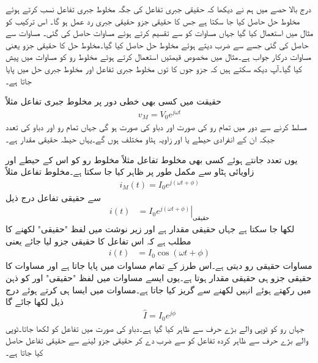 درج بالا حصے میں ہم نے دیکھا کہ حقیقی جبری تفاعل کی جگہ مخلوط جبری تفاعل نسب کرتے ہوئے مخلوط حل حاصل کیا جا سکتا ہے جس کا حقیقی جزو حقیقی جبری رد عمل ہو گا۔ اس ترکیب کو مثال  میں استعمال کیا گیا جہاں مساوات  کو  سے تقسیم کرتے ہوئے مساوات  حاصل کی گئی۔ مساوات  سے  حاصل کی گئی جسے   سے ضرب دیتے ہوئے مخلوط حل حاصل کیا گیا۔مخلوط حل کا حقیقی جزو یعنی مساوات  درکار جواب ہے۔مثال  میں  مخصوص قیمتیں استعمال کرتے  ہوئے مخلوط رو کو مساوات   میں پیش کیا گیا۔آپ دیکھ سکتے ہیں کہ جزو   جوں کا توں مخلوط جبری تفاعل اور مخلوط جبری حل میں پایا جاتا ہے۔

حقیقت میں کسی بھی خطی دور پر مخلوط جبری تفاعل مثلاً
\begin{align}
v_M=V_0 e^{j \omega t}
\end{align}
مسلط کرنے سے دور میں تمام رو کی صورت  اور دباو کی صورت  ہو گی جہاں تمام رو اور دباو  کی تعدد  جبکہ ان کے انفرادی  حیطے  یا  اور زاویہ ہٹاو  مختلف ہوں گے۔یہاں حیطہ حقیقی مقدار ہے۔

یوں تعدد جانتے ہوئے کسی بھی مخلوط تفاعل مثلاً مخلوط رو کو اس کے حیطے  اور زاویائی ہٹاو  سے مکمل طور پر ظاہر کیا جا سکتا ہے۔مخلوط تفاعل مثلاً 
\begin{align}
i_M(t)=I_0 e^{j(\omega t+\phi)}
\end{align}
سے حقیقی تفاعل درج ذیل
\begin{align}\label{مساوات_بدلتا_حقیقی_رو_الف}
i(t)&=\left. I_0 e^{j(\omega t+\phi)} \right|_{\text{حقیقی}}
\end{align}
لکھا جا سکتا ہے جہاں  حقیقی مقدار ہے اور زیر نوشت میں لفظ "حقیقی" لکھنے کا مطلب ہے کہ اس تفاعل کا حقیقی جزو لیا جائے یعنی
\begin{align}\label{مساوات_بدلتا_حقیقی_رو_ب}
i(t)&=I_0 \cos (\omega t+\phi)
\end{align}
مساوات  حقیقی رو دیتی ہے۔اس طرز کے تمام مساوات میں  پایا جاتا ہے اور مساوات کا حقیقی جزو ہی حقیقی مقدار ہوتا ہے۔یوں ایسے مساوات میں لفظ "حقیقی" اور  کو ذہن میں رکھتے ہوئے انہیں لکھنے سے گریز کیا جاتا ہے۔مساوات  میں ایسا ہی کرتے ہوئے درج ذیل لکھا جائے گا
\begin{align}\label{مساوات_بدلتا_دوری_سمتیہ_الف}
\hat{I}=I_0e^{j\phi}
\end{align}
جہاں رو کو ٹوپی والے بڑے حرف سے ظاہر کیا گیا ہے۔دباو کی صورت میں تفاعل کو  لکھا جاتا۔ٹوپی والے بڑے حرف سے ظاہر کردہ تفاعل کو  سے ضرب دے کر حقیقی جزو لینے سے حقیقی تفاعل حاصل کیا جاتا ہے۔

